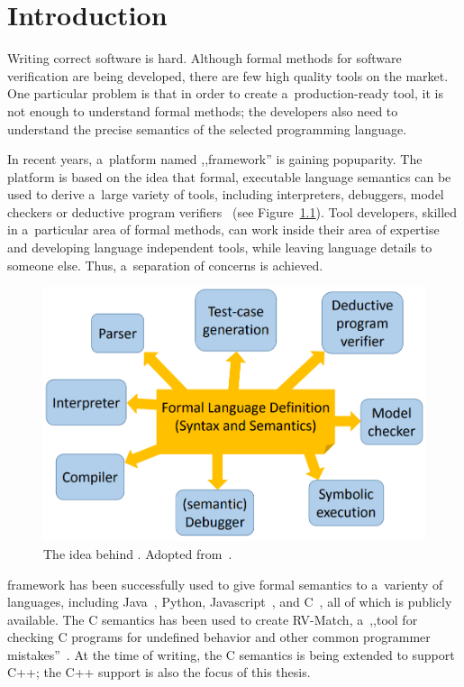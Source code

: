 \documentclass{fithesis3}
\begin{document}
\chapter{Introduction}

Writing correct software is hard.
Although formal methods for software verification are being developed, there are few high quality tools on the market. One particular problem is that in order to create a~production-ready tool, it is not enough to understand formal methods; the developers also need to understand the precise semantics of the selected programming language.

In recent years, a~platform named ,,\K framework'' is gaining popuparity. The platform is based on the idea that formal, executable language semantics can be used to derive a~large variety of tools, including interpreters, debuggers, model checkers or deductive program verifiers~\cite{rosu-2017-marktoberdorf} (see Figure~\ref{kidea}). Tool developers, skilled in a~particular area of formal methods, can work inside their area of expertise and developing language independent tools, while leaving language details to someone else. Thus, a~separation of concerns is achieved.


\begin{figure}[h]
\centering
\includegraphics[width=0.7\linewidth]{img/kidea.png}
\caption{The idea behind \K. Adopted from~\cite{rosu-2015-meseguer}.}
\label{kidea}
\end{figure}

\K framework has been successfully used to give formal semantics to a~varienty of languages, including Java~\cite{bogdanas-rosu-2015-popl}, Python, Javascript~\cite{park-stefanescu-rosu-2015-pldi}, and C~\cite{ellison-2012-thesis,hathhorn-ellison-rosu-2015-pldi}, all of which is publicly available. The C semantics has been used to create RV-Match, a~,,tool for checking C programs for
undefined behavior and other common programmer mistakes''~\cite{guth-hathhorn-saxena-rosu-2016-cav}.  At the time of writing, the C semantics is being extended to support C++; the C++ support is also the focus of this thesis.
\end{document}
